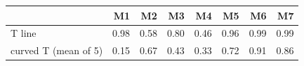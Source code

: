 \begin{tabular}{lrrrrrrr}
\toprule
 & M1 & M2 & M3 & M4 & M5 & M6 & M7 \\
\midrule
T line & 0.98 & 0.58 & 0.80 & 0.46 & 0.96 & 0.99 & 0.99 \\
curved T (mean of 5) & 0.15 & 0.67 & 0.43 & 0.33 & 0.72 & 0.91 & 0.86 \\
\bottomrule
\end{tabular}
